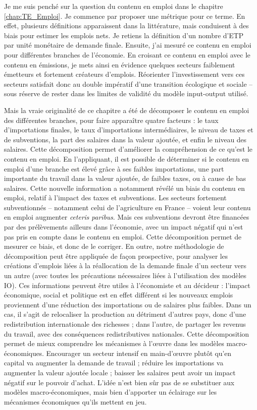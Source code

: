 Je me suis penché sur la question du contenu en emploi dans le chapitre \ref{chap:TE_Emploi}. Je commence par proposer une métrique pour ce terme. En effet, plusieurs définitions apparaissent dans la littérature, mais conduisent à des biais pour estimer les emplois nets. Je retiens la définition d’un nombre d’ETP par unité monétaire de demande finale.
Ensuite, j’ai mesuré ce contenu en emploi pour différentes branches de l’économie. En croisant ce contenu en emploi avec le contenu en émissions, je mets ainsi en évidence quelques secteurs faiblement émetteurs et fortement créateurs d’emplois. Réorienter l’investissement vers ces secteurs satisfait donc au double impératif d’une transition écologique et sociale – sous réserve de rester dans les limites de validité du modèle input-output utilisé.

Mais la vraie originalité de ce chapitre a été de décomposer le contenu en emploi des différentes branches, pour faire apparaître quatre facteurs : le taux d’importations finales, le taux d’importations intermédiaires, le niveau de taxes et de subventions, la part des salaires dans la valeur ajoutée, et enfin le niveau des salaires.
Cette décomposition permet d’améliorer la compréhension de ce qu’est le contenu en emploi. En l’appliquant, il est possible de déterminer si le contenu en emploi d’une branche est élevé grâce à ses faibles importations, une part importante du travail dans la valeur ajoutée, de faibles taxes, ou à cause de bas salaires.
Cette nouvelle information a notamment révélé un biais du contenu en emploi, relatif à l’impact des taxes et subventions. Les secteurs fortement subventionnés -- notamment celui de l'agriculture en France -- voient leur contenu en emploi augmenter \textit{ceteris paribus}. Mais ces subventions devront être financées par des prélèvements ailleurs dans l’économie, avec un impact négatif qui n’est pas pris en compte dans le contenu en emploi. Cette décomposition permet de mesurer ce biais, et donc de le corriger. 
En outre, notre méthodologie de décomposition peut être appliquée de façon prospective, pour analyser les créations d’emplois liées à la réallocation de la demande finale d’un secteur vers un autre (avec toutes les précautions nécessaires liées à l’utilisation des modèles IO). Ces informations peuvent être utiles à l’économiste et au décideur : l’impact économique, social et politique est en effet différent si les nouveaux emplois proviennent d’une réduction des importations ou de salaires plus faibles. Dans un cas, il s’agit de relocaliser la production au détriment d’autres pays, donc d’une redistribution internationale des richesses ; dans l’autre, de partager les revenus du travail, avec des conséquences redistributives nationales.
Cette décomposition permet de mieux comprendre les mécanismes à l’œuvre dans les modèles macro-économiques. Encourager un secteur intensif en main-d’œuvre plutôt qu’en capital va augmenter la demande de travail ; réduire les importations va augmenter la valeur ajoutée locale ; baisser les salaires peut avoir un impact négatif sur le pouvoir d’achat. L’idée n’est bien sûr pas de se substituer aux modèles macro-économiques, mais bien d’apporter un éclairage sur les mécanismes économiques qu’ils mettent en jeu.

